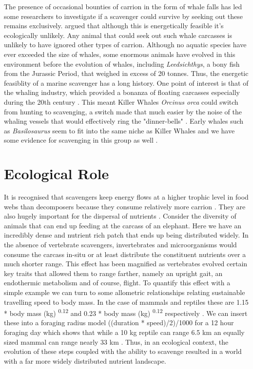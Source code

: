 \documentclass[a4paper,12pt]{article}
\begin{document}
The presence of occasional bounties of carrion in the form of whale falls has led some researchers to investigate if a scavenger could survive by seeking out these remains exclusively. \cite{ruxton2005searching} argued that although this is energetically feasible it's ecologically unlikely. Any animal that could seek out such whale carcasses is unlikely to have ignored other types of carrion. Although no aquatic species have ever exceeded the size of whales, some enormous animals have evolved in this environment before the evolution of whales, including \textit{Leedsichthys}, a bony fish from the Jurassic Period, that weighed in excess of 20 tonnes. Thus, the energetic feasiblity of a marine scavenger has a long history. One point of interest is that of the whaling industry, which provided a bonanza of floating carcasses especially during the 20th century \citep{Whitehead415}. This meant Killer Whales \textit{Orcinus orca} could switch from hunting to scavenging, a switch made that much easier by the noise of the whaling vessels that would effectively ring the "dinner-bells" \citep{Whitehead415}. Early whales such as \textit{Basilosaurus} seem to fit into the same niche as Killer Whales and we have some evidence for scavenging in this group as well \citep{fahlke2012bite}. 

\section*{Ecological Role}
It is recognised that scavengers keep energy flows at a higher trophic level in food webs than decomposers because they consume relatively more carrion \citep{devault2003scavenging}. They are also hugely important for the dispersal of nutrients \citep{benbow2015introduction}. Consider the diversity of animals that can end up feeding at the carcass of an elephant. Here we have an incredibly dense and nutrient rich patch that ends up being distributed widely. In the absence of vertebrate scavengers, invertebrates and microorganisms would consume the carcass in-situ or at least distribute the constituent nutrients over a much shorter range. This effect has been magnified as vertebrates evolved certain key traits that allowed them to range farther, namely an upright gait, an endothermic metabolism and of course, flight. To quantify this effect with a simple example we can turn  to some allometric relationships relating sustainable travelling speed to body mass. In the case of mammals and reptiles these are 1.15 * body mass (kg) \textsuperscript{0.12} and 0.23 * body mass (kg) \textsuperscript{0.12}
respectively \citep{ruxton2004obligate}. We can insert these into a foraging radius model ((duration * speed)/2)/1000 for a 12 hour foraging day which shows that while a 10 kg reptile can range 6.5 km an equally sized mammal can range nearly 33 km \citep{Enstipp2006Energetics}. Thus, in an ecological context, the evolution of these steps coupled with the ability to scavenge resulted in a world with a far more widely distributed nutrient landscape. 
\end{document}

